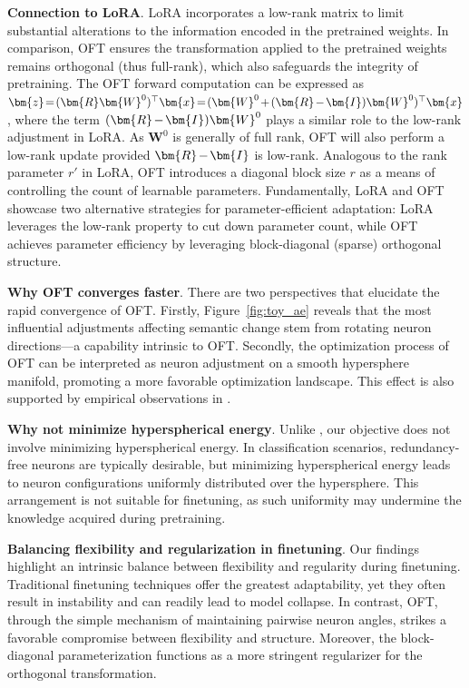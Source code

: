 \textbf{Connection to LoRA}. LoRA incorporates a low-rank matrix to limit substantial alterations to the information encoded in the pretrained weights. In comparison, OFT ensures the transformation applied to the pretrained weights remains orthogonal (thus full-rank), which also safeguards the integrity of pretraining. The OFT forward computation can be expressed as $\thickmuskip=2mu \medmuskip=2mu \bm{z}=(\bm{R}\bm{W}^0)^\top\bm{x}=(\bm{W}^0+(\bm{R}-\bm{I})\bm{W}^0)^\top\bm{x}$, where the term $\thickmuskip=2mu \medmuskip=2mu (\bm{R}-\bm{I})\bm{W}^0$ plays a similar role to the low-rank adjustment in LoRA. As $\bm{W}^0$ is generally of full rank, OFT will also perform a low-rank update provided $\thickmuskip=2mu \medmuskip=2mu \bm{R}-\bm{I}$ is low-rank. Analogous to the rank parameter $r'$ in LoRA, OFT introduces a diagonal block size $r$ as a means of controlling the count of learnable parameters. Fundamentally, LoRA and OFT showcase two alternative strategies for parameter-efficient adaptation: LoRA leverages the low-rank property to cut down parameter count, while OFT achieves parameter efficiency by leveraging block-diagonal (sparse) orthogonal structure.

\textbf{Why OFT converges faster}. There are two perspectives that elucidate the rapid convergence of OFT. Firstly, Figure~\ref{fig:toy_ae} reveals that the most influential adjustments affecting semantic change stem from rotating neuron directions—a capability intrinsic to OFT. Secondly, the optimization process of OFT can be interpreted as neuron adjustment on a smooth hypersphere manifold, promoting a more favorable optimization landscape. This effect is also supported by empirical observations in \cite{liu2021orthogonal}.

\textbf{Why not minimize hyperspherical energy}. Unlike \cite{liu2021orthogonal}, our objective does not involve minimizing hyperspherical energy. In classification scenarios, redundancy-free neurons are typically desirable, but minimizing hyperspherical energy leads to neuron configurations uniformly distributed over the hypersphere. This arrangement is not suitable for finetuning, as such uniformity may undermine the knowledge acquired during pretraining.

\textbf{Balancing flexibility and regularization in finetuning}. Our findings highlight an intrinsic balance between flexibility and regularity during finetuning. Traditional finetuning techniques offer the greatest adaptability, yet they often result in instability and can readily lead to model collapse. In contrast, OFT, through the simple mechanism of maintaining pairwise neuron angles, strikes a favorable compromise between flexibility and structure. Moreover, the block-diagonal parameterization functions as a more stringent regularizer for the orthogonal transformation.


